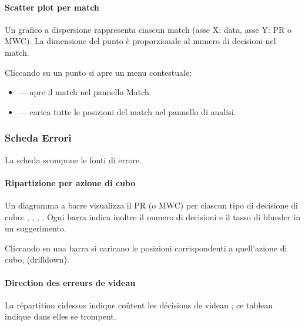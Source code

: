 \documentclass[letterpaper,10pt,italian]{sphinxmanual}
\begin{document}
\paragraph{Scatter plot per match}
\label{\detokenize{manuel:scatter-plot-par-match}}
\sphinxAtStartPar
Un grafico a dispersione rappresenta ciascun match (asse X: data, asse Y: PR o MWC). La dimensione del punto è proporzionale al numero di decisioni nel match.

\sphinxAtStartPar
Cliccando su un punto si apre un menu contestuale:
\begin{itemize}
\item {} 
\sphinxAtStartPar
{} — apre il match nel pannello Match.

\item {} 
\sphinxAtStartPar
{} — carica tutte le posizioni del match nel pannello di analisi.

\end{itemize}


\subsubsection{Scheda Errori}
\label{\detokenize{manuel:onglet-erreurs}}
\sphinxAtStartPar
La scheda  scompone le fonti di errore.


\paragraph{Ripartizione per azione di cubo}
\label{\detokenize{manuel:repartition-par-action-de-videau}}
\sphinxAtStartPar
Un diagramma a barre visualizza il PR (o MWC) per ciascun tipo di decisione di cubo: , , , . Ogni barra indica inoltre il numero di decisioni e il tasso di blunder in un suggerimento.

\sphinxAtStartPar
Cliccando su una barra si caricano le posizioni corrispondenti a quell’azione di cubo,  (drill\sphinxhyphen{}down).


\paragraph{Direction des erreurs de videau}
\label{\detokenize{manuel:direction-des-erreurs-de-videau}}
\sphinxAtStartPar
La répartition ci\sphinxhyphen{}dessus indique  coûtent les décisions de videau ;
ce tableau indique dans  elles se trompent.
\end{document}
